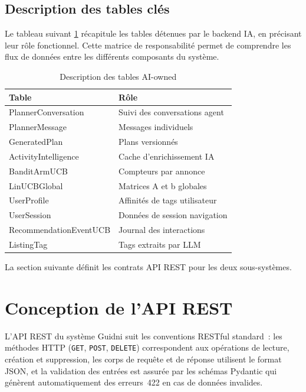 \subsection{Description des tables clés}

Le tableau suivant \ref{tab:ai_tables} récapitule les tables détenues par le backend IA, en précisant leur rôle
fonctionnel. Cette matrice de
responsabilité permet de comprendre les flux de données entre les différents composants du
système.

\begin{table}[H]
    \centering
    \caption{Description des tables AI-owned}
    \label{tab:ai_tables}
    \small
    \begin{tabular}{p{6.7cm} p{7.3cm}  }
        \toprule
        \textbf{Table} & \textbf{Rôle}  \\
        \midrule
        PlannerConversation & Suivi des conversations agent  \\[2pt]
        PlannerMessage & Messages individuels \\[2pt]
        GeneratedPlan & Plans versionnés  \\[2pt]
        ActivityIntelligence & Cache d'enrichissement IA \\[2pt]
        BanditArmUCB & Compteurs par annonce  \\[2pt]
        LinUCBGlobal & Matrices A et b globales \\[2pt]
        UserProfile & Affinités de tags utilisateur  \\[2pt]
        UserSession & Données de session navigation  \\[2pt]
        RecommendationEventUCB & Journal des interactions  \\[2pt]
        ListingTag & Tags extraits par LLM  \\
        \bottomrule
    \end{tabular}
\end{table}

La section suivante définit les contrats API REST pour les deux sous-systèmes.


\section{Conception de l'API REST}

L'API REST du système Guidni suit les conventions RESTful standard~: les méthodes HTTP
(\texttt{GET}, \texttt{POST}, \texttt{DELETE}) correspondent aux opérations de lecture, création
et suppression, les corps de requête et de réponse utilisent le format JSON, et la validation
des entrées est assurée par les schémas Pydantic qui génèrent automatiquement des erreurs~422
en cas de données invalides.


